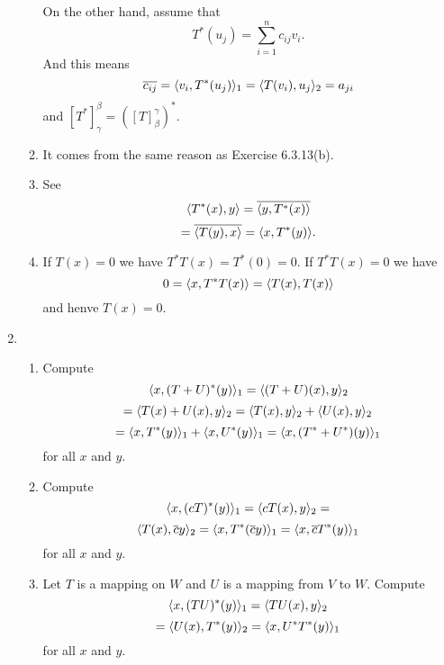 \begin{enumerate}
\begin{enumerate}
On the other hand, assume that 
\[T^*(u_j)=\sum_{i=1}^n{c_{ij}v_i}.\]
And this means 
\[\overline{c_{ij}}=\langle v_i,T^*(u_j)\rangle_1 =\langle T(v_i),u_j\rangle_2 =a_{ji}\]
and $[T^*]_{\gamma}^{\beta}=([T]_{\beta}^{\gamma})^*$.
\item It comes from the same reason as Exercise 6.3.13(b).
\item See 
\[\langle T^*(x),y\rangle =\overline{\langle y,T^*(x)\rangle }\]
\[=\overline{\langle T(y),x\rangle }=\langle x,T^*(y)\rangle .\]
\item If $T(x)=0$ we have $T^*T(x)=T^*(0)=0$. If $T^*T(x)=0$ we have 
\[0=\langle x,T^*T(x)\rangle =\langle T(x),T(x)\rangle \]
and henve $T(x)=0$.
\end{enumerate}
\item \begin{enumerate}
\item Compute 
\[\langle x,(T+U)^*(y)\rangle_1=\langle (T+U)(x),y\rangle_2\]
\[=\langle T(x)+U(x),y\rangle_2 =\langle T(x),y\rangle_2+\langle U(x),y\rangle_2 \]
\[=\langle x,T^*(y)\rangle_1+\langle x,U^*(y)\rangle_1=\langle x,(T^*+U^*)(y)\rangle_1\]
for all $x$ and $y$.
\item Compute 
\[\langle x,(cT)^*(y)\rangle_1 =\langle cT(x),y\rangle_2 =\]
\[\langle T(x),\overline{c}y\rangle_2 =\langle x,T^*(\overline{c}y)\rangle_1 =\langle x,\overline{c}T^*(y)\rangle_1 \]
for all $x$ and $y$.
\item Let $T$ is a mapping on $W$ and $U$ is a mapping from $V$ to $W$. Compute 
\[\langle x,(TU)^*(y)\rangle_1 =\langle TU(x),y\rangle_2 \]
\[=\langle U(x),T^*(y)\rangle_2 =\langle x,U^*T^*(y)\rangle_1 \]
for all $x$ and $y$.


\end{enumerate}
\end{enumerate}
